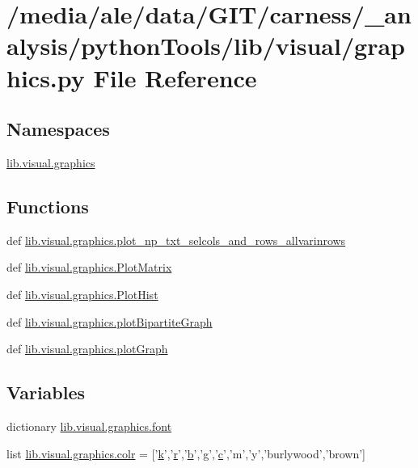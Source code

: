 \hypertarget{a00061}{\section{/media/ale/data/\-G\-I\-T/carness/\-\_\-analysis/python\-Tools/lib/visual/graphics.py File Reference}
\label{a00061}
}
\subsection*{Namespaces}
\begin{DoxyCompactItemize}
\item 
\hyperlink{a00121}{lib.\-visual.\-graphics}
\end{DoxyCompactItemize}
\subsection*{Functions}
\begin{DoxyCompactItemize}
\item 
def \hyperlink{a00121_aa27c34e948992165c7a98e5ca3605549}{lib.\-visual.\-graphics.\-plot\-\_\-np\-\_\-txt\-\_\-selcols\-\_\-and\-\_\-rows\-\_\-allvarinrows}
\item 
def \hyperlink{a00121_a99e047c066345a973bfbb527e8a91085}{lib.\-visual.\-graphics.\-Plot\-Matrix}
\item 
def \hyperlink{a00121_ae680735d3b55a1e1af1fb113f492ad76}{lib.\-visual.\-graphics.\-Plot\-Hist}
\item 
def \hyperlink{a00121_a2035a4545db129f4505350f218308393}{lib.\-visual.\-graphics.\-plot\-Bipartite\-Graph}
\item 
def \hyperlink{a00121_ad28be6c8222baa4c1ee421610005c710}{lib.\-visual.\-graphics.\-plot\-Graph}
\end{DoxyCompactItemize}
\subsection*{Variables}
\begin{DoxyCompactItemize}
\item 
dictionary \hyperlink{a00121_a3c83ccb4d4d1fcb0ea5f6b8616a1d0df}{lib.\-visual.\-graphics.\-font}
\item 
list \hyperlink{a00121_aae94b6a9df961a260c0fa476e2b4693a}{lib.\-visual.\-graphics.\-colr} = \mbox{[}'\hyperlink{a00018_a1c73327b2882639bc9f5e416bb3cc7ac}{k}','\hyperlink{a00024_ac862e7284527eb913b1351c8bfb8e079}{r}','\hyperlink{a00028_a50b4f3ddde10830a3976c71083aaee3f}{b}','g','\hyperlink{a00028_a6be92348ba85ef257b11d06209e1d7b6}{c}','m','y','burlywood','brown'\mbox{]}
\end{DoxyCompactItemize}
